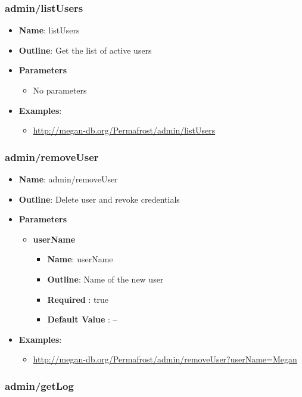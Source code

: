 \documentclass[11pt]{article}
\begin{document}
\subsubsection{admin/listUsers}
\label{subsubsec:userInterface}
\begin{itemize}
	\item \textbf{Name}: listUsers
	\item \textbf{Outline}: Get the list of active users
	\item \textbf{Parameters}
		\begin{itemize}
			\item No parameters
		\end{itemize}
	\item \textbf{Examples}:
		\begin{itemize}
			\item \url{http://megan-db.org/Permafrost/admin/listUsers}
		\end{itemize}
\end{itemize}
\subsubsection{admin/removeUser}
\begin{itemize}
	\item \textbf{Name}: admin/removeUser
	\item \textbf{Outline}: Delete user and revoke credentials
	\item \textbf{Parameters}
		\begin{itemize}
			\item \textbf{userName}
				\begin{itemize}
					\item \textbf{Name}: userName
					\item \textbf{Outline}: Name of the new user
					\item \textbf{Required} : true
					\item \textbf{Default Value} : --
				\end{itemize}
		\end{itemize}
	\item \textbf{Examples}:
		\begin{itemize}
			\item \url{http://megan-db.org/Permafrost/admin/removeUser?userName=Megan}
		\end{itemize}
\end{itemize}
\subsubsection{admin/getLog}
\end{document}
